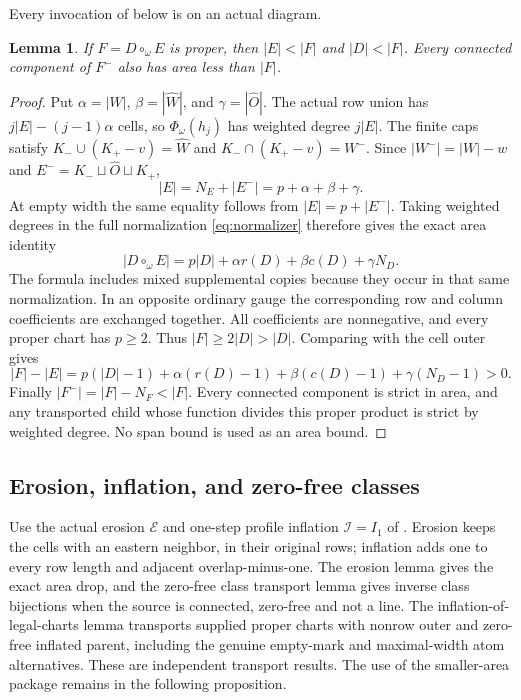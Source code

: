 \documentclass[11pt,a4paper]{amsart}
\numberwithin{equation}{section}
\theoremstyle{plain}
\newtheorem{lemma}[theorem]{Lemma}
\theoremstyle{definition}
\begin{document}
Every invocation of  below is on an actual diagram.
\begin{lemma}\label{lem:strict-area}
If \(F=D\circ_\omega E\) is proper, then \(|E|<|F|\) and \(|D|<|F|\).
Every connected component of \(F^-\) also has area less than \(|F|\).
\end{lemma}
\begin{proof}
Put \(\alpha=|W|\), \(\beta=|\widehat W|\), and \(\gamma=|\widehat O|\).
The actual row union has \(j|E|-(j-1)\alpha\) cells, so
\(\Phi_\omega(h_j)\) has weighted degree \(j|E|\).
The finite caps satisfy
\(K_-\cup(K_+-v)=\widehat W\) and
\(K_-\cap(K_+-v)=W^-\).
Since \(|W^-|=|W|-w\) and \(E^-=K_-\sqcup\widehat O\sqcup K_+\),
\[
 |E|=N_E+|E^-|=p+\alpha+\beta+\gamma.
\]
At empty width the same equality follows from \(|E|=p+|E^-|\).
Taking weighted degrees in the full normalization \eqref{eq:normalizer}
therefore gives the exact area identity
\[
 |D\circ_\omega E|
   =p|D|+\alpha r(D)+\beta c(D)+\gamma N_D.
\]
The formula includes mixed supplemental copies because they occur in that
same normalization.  In an opposite ordinary gauge the corresponding
row and column coefficients are exchanged together.
All coefficients are nonnegative, and every proper chart has \(p\ge2\).
Thus \(|F|\ge2|D|>|D|\).  Comparing with the cell outer gives
\[
 |F|-|E|=p(|D|-1)+\alpha(r(D)-1)+\beta(c(D)-1)
                  +\gamma(N_D-1)>0.
\]
Finally \(|F^-|=|F|-N_F<|F|\).  Every connected component is strict in
area, and any transported child whose function divides this proper
product is strict by weighted degree.  No span bound is used as an area
bound.
\end{proof}

\subsection{Erosion, inflation, and zero-free classes}

Use the actual erosion \(\mathcal E\) and one-step profile inflation
\(\mathcal I=I_1\) of \cite{Shields2026Inflation}.  Erosion keeps the
cells with an eastern neighbor, in their original rows; inflation adds
one to every row length and adjacent overlap-minus-one.  The erosion
lemma gives the exact area drop, and the zero-free class transport
lemma gives inverse class bijections when the source is connected,
zero-free and not a line.  The inflation-of-legal-charts lemma transports
supplied proper charts with nonrow outer and zero-free inflated parent,
including the genuine empty-mark and maximal-width atom alternatives.
These are independent transport results.  The use of the smaller-area
package remains in the following proposition.
\end{document}
